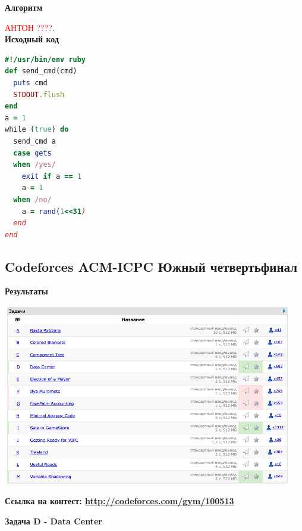 \documentclass[a4paper,12pt]{article}
\begin{document}
\textbf{{\large Алгоритм}}

\textcolor{red}{\Huge{АНТОН ????}}. \\

\newpage
\textbf{{\large Исходный код}} \\
\begin{lstlisting}[language=Ruby]
#!/usr/bin/env ruby
def send_cmd(cmd)
  puts cmd
  STDOUT.flush
end
a = 1
while (true) do
  send_cmd a
  case gets
  when /yes/
    exit if a == 1
    a = 1
  when /no/
    a = rand(1<<31)
  end
end

\end{lstlisting}



%
%
\newpage
\subsection{Codeforces ACM-ICPC Южный четвертьфинал}

\textbf{{\large Результаты}} \\
\begin{center}
\includegraphics[width=0.95\textwidth]{CT_ACM_WEST/CT_ACM_WEST_result.png}\\ [1cm]
\end{center}

\textbf{{\large Ссылка на контест: \url{http://codeforces.com/gym/100513}}}

\newpage
\textbf{{\large Задача D - Data Center}}
\end{document}
